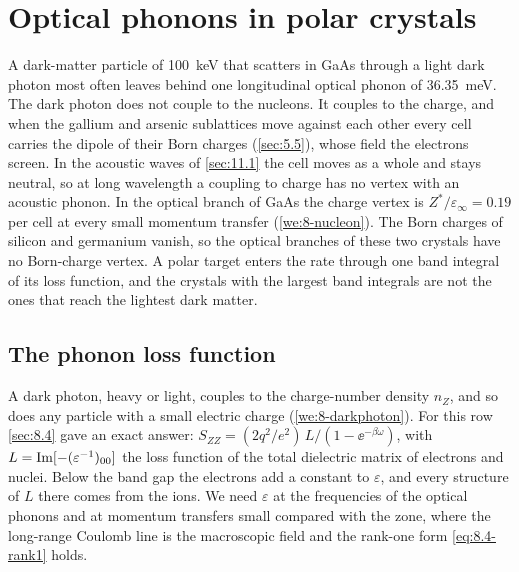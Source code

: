 \section{Optical phonons in polar crystals}\label{sec:11.2}

A dark-matter particle of \SI{100}{keV} that scatters in GaAs through a light dark photon most often leaves behind one longitudinal optical phonon of \SI{36.35}{meV}. The dark photon does not couple to the nucleons. It couples to the charge, and when the gallium and arsenic sublattices move against each other every cell carries the dipole of their Born charges (\cref{sec:5.5}), whose field the electrons screen. In the acoustic waves of \cref{sec:11.1} the cell moves as a whole and stays neutral, so at long wavelength a coupling to charge has no vertex with an acoustic phonon. In the optical branch of GaAs the charge vertex is $Z^*/\varepsilon_\infty = 0.19$ per cell at every small momentum transfer (\cref{we:8-nucleon}). The Born charges of silicon and germanium vanish, so the optical branches of these two crystals have no Born-charge vertex. A polar target enters the rate through one band integral of its loss function, and the crystals with the largest band integrals are not the ones that reach the lightest dark matter.

\subsection{The phonon loss function}\label{sec:11.2-loss}

A dark photon, heavy or light, couples to the charge-number density $n_Z$, and so does any particle with a small electric charge (\cref{we:8-darkphoton}). For this row \cref{sec:8.4} gave an exact answer: $S_{ZZ} = (2q^2/e^2)\,L/(1 - \ee^{-\beta\omega})$, with $L = \operatorname{Im}[-(\varepsilon^{-1})_{00}]$ the loss function of the total dielectric matrix of electrons and nuclei. Below the band gap the electrons add a constant to $\varepsilon$, and every structure of $L$ there comes from the ions. We need $\varepsilon$ at the frequencies of the optical phonons and at momentum transfers small compared with the zone, where the long-range Coulomb line is the macroscopic field and the rank-one form \cref{eq:8.4-rank1} holds.


